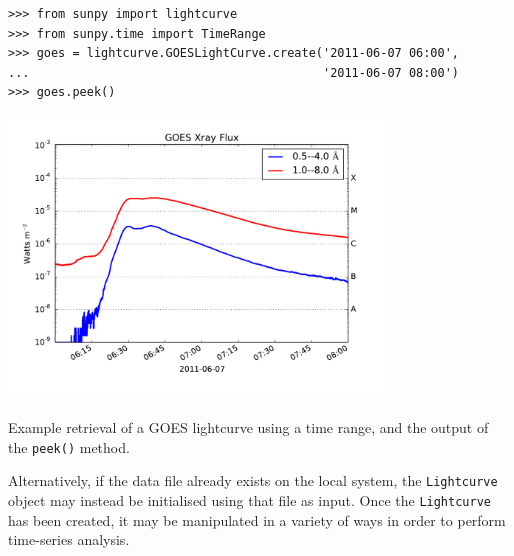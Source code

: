 \begin{listing}[H]
\begin{verbatim}
>>> from sunpy import lightcurve
>>> from sunpy.time import TimeRange
>>> goes = lightcurve.GOESLightCurve.create('2011-06-07 06:00',
...                                         '2011-06-07 08:00')
>>> goes.peek()
\end{verbatim}
\begin{center}
\includegraphics[width=10cm]{goes_lightcurve.pdf}
\end{center}
\caption{Example retrieval of a GOES lightcurve
using a time range, and the output of the 
\texttt{peek()} method.}
\label{code:goes_lc}
\end{listing}

Alternatively, if the data file already exists on the local system, the 
\texttt{Lightcurve} object may instead be initialised using that file as input.
Once the \texttt{Lightcurve} has been created, it may be manipulated in 
a variety of ways in order to perform time-series analysis.

